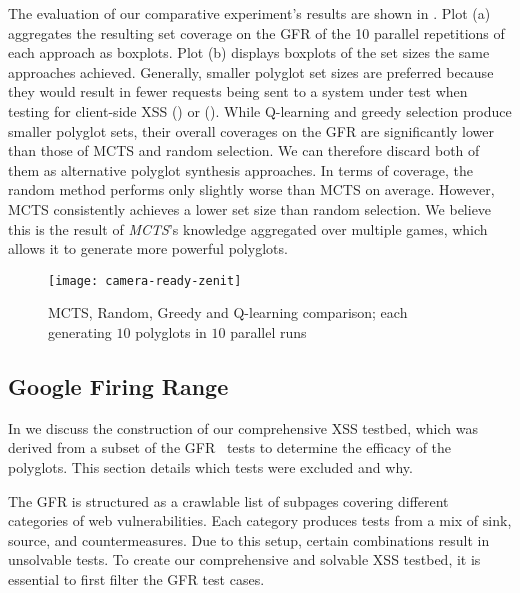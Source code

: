 The evaluation of our comparative experiment's results are shown in .
Plot (a) aggregates the resulting set coverage on the GFR of the \num{10} parallel repetitions of each approach as boxplots. 
Plot (b) displays boxplots of the set sizes the same approaches achieved.
Generally, smaller polyglot set sizes are preferred because they would result in fewer requests being sent to a system under test when testing for client-side XSS () or \blindxss{} (). %
While Q-learning and greedy selection produce smaller polyglot sets, their overall coverages on the GFR are significantly lower than those of MCTS and random selection.
We can therefore discard both of them as alternative polyglot synthesis approaches.
In terms of coverage, the random method performs only slightly worse than MCTS on average.
However, MCTS consistently achieves a lower set size than random selection.
We believe this is the result of \emph{MCTS}'s knowledge aggregated over multiple games, which allows it to generate more powerful polyglots. %



\begin{figure}[htb]
    \centering
    \texttt{[image: camera-ready-zenit]}
    \caption{
    MCTS, Random, Greedy and Q-learning comparison; each generating $10$ polyglots in $10$ parallel runs
    }\label{fig:comparison-approaches}
\end{figure}

\subsection{Google Firing Range}\label{appendix:gfr-exclusions}
\newcommand{\gfrcategory}[1]{``{#1}''}

In  we discuss the construction of our comprehensive XSS testbed, which was derived from a subset of the GFR~\cite{github-firing-range} tests to determine the efficacy of the polyglots.
This section details which tests were excluded and why.






The GFR is structured as a crawlable list of subpages covering different categories of web vulnerabilities.
Each category produces tests from a mix of sink, source, and countermeasures.
Due to this setup, certain combinations result in unsolvable tests.
To create our comprehensive and solvable XSS testbed, it is essential to first filter the GFR test cases. 

